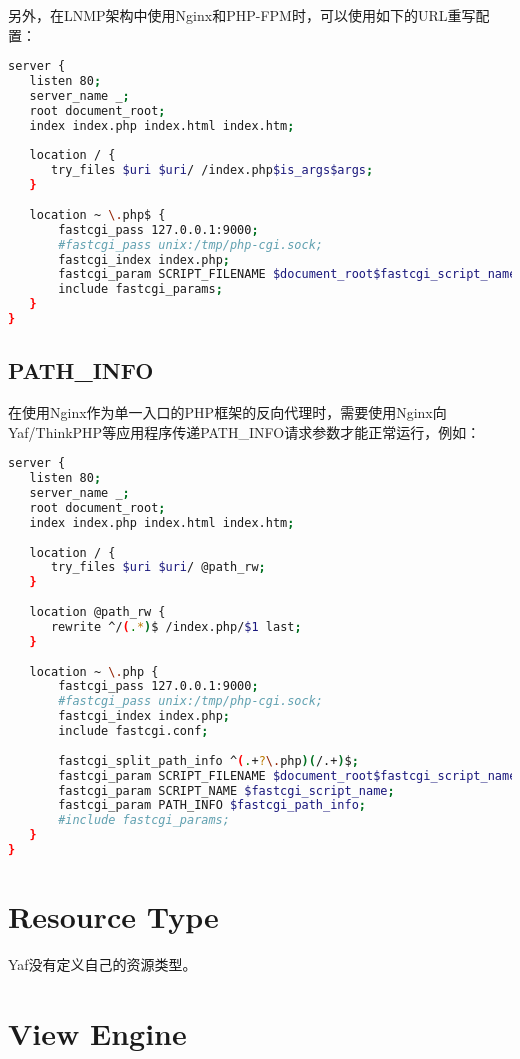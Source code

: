 另外，在LNMP架构中使用Nginx和PHP-FPM时，可以使用如下的URL重写配置：

\begin{lstlisting}[language=bash]
server {
   listen 80;
   server_name _;
   root document_root;
   index index.php index.html index.htm;
   
   location / {
      try_files $uri $uri/ /index.php$is_args$args;
   }
   
   location ~ \.php$ {
       fastcgi_pass 127.0.0.1:9000;
       #fastcgi_pass unix:/tmp/php-cgi.sock;
       fastcgi_index index.php;
       fastcgi_param SCRIPT_FILENAME $document_root$fastcgi_script_name;
       include fastcgi_params;  
   }
}
\end{lstlisting}


\subsection{PATH\_INFO}

在使用Nginx作为单一入口的PHP框架的反向代理时，需要使用Nginx向Yaf/ThinkPHP等应用程序传递PATH\_INFO请求参数才能正常运行，例如：


\begin{lstlisting}[language=bash]
server {
   listen 80;
   server_name _;
   root document_root;
   index index.php index.html index.htm;
   
   location / {
      try_files $uri $uri/ @path_rw;
   }
   
   location @path_rw {
      rewrite ^/(.*)$ /index.php/$1 last;
   }
   
   location ~ \.php {
       fastcgi_pass 127.0.0.1:9000;
       #fastcgi_pass unix:/tmp/php-cgi.sock;
       fastcgi_index index.php;
       include fastcgi.conf;
       
       fastcgi_split_path_info ^(.+?\.php)(/.+)$;
       fastcgi_param SCRIPT_FILENAME $document_root$fastcgi_script_name;
       fastcgi_param SCRIPT_NAME $fastcgi_script_name;
       fastcgi_param PATH_INFO $fastcgi_path_info;
       #include fastcgi_params;  
   }
}
\end{lstlisting}



\section{Resource Type}

Yaf没有定义自己的资源类型。


\section{View Engine}


